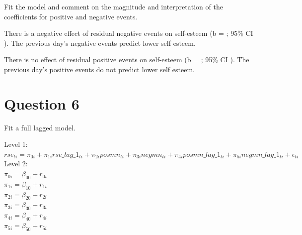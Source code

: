 \documentclass[]{article}
\begin{document}
Fit the model and comment on the magnitude and interpretation of the
coefficients for positive and negative events.

There is a negative effect of residual negative events on self-esteem (b
= ; 95\% CI ). The previous day's negative events predict lower self
esteem.

There is no effect of residual positive events on self-esteem (b = ;
95\% CI ). The previous day's positive events do not predict lower self
esteem.

\section{Question 6}\label{question-6}

Fit a full lagged model.

Level 1:\\
\(rse_{ti} = \pi_{0i} + \pi_{1i}rse\_lag\_1_{ti} + \pi_{2i}posmn_{ti} + \pi_{3i}negmn_{ti} + \pi_{4i}posmn\_lag\_1_{ti} + \pi_{5i}negmn\_lag\_1_{ti} + \epsilon_{ti}\)\\
Level 2:\\
\(\pi_{0i} = \beta_{00} + r_{0i}\)\\
\(\pi_{1i} = \beta_{10} + r_{1i}\)\\
\(\pi_{2i} = \beta_{20} + r_{2i}\)\\
\(\pi_{3i} = \beta_{30} + r_{3i}\)\\
\(\pi_{4i} = \beta_{40} + r_{4i}\)\\
\(\pi_{5i} = \beta_{50} + r_{5i}\)
\end{document}
